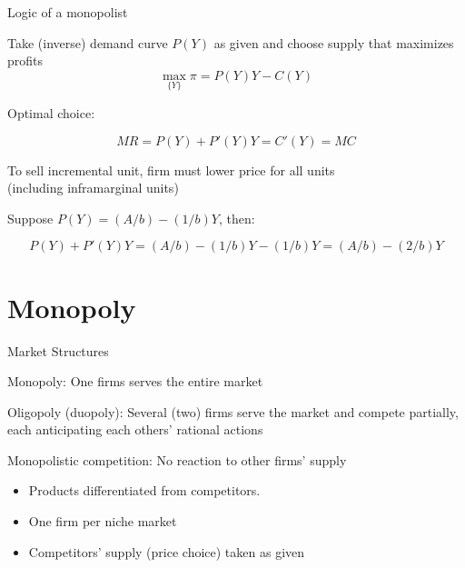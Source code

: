 \documentclass[notes,11pt, aspectratio=169, xcolor=table]{beamer}
\newenvironment{wideitemize}{\itemize\addtolength{\itemsep}{10pt}}{\enditemize}
\begin{document}
\begin{frame}{Logic of a monopolist}

  \begin{wideitemize}
      \item Take (inverse) demand curve $P(Y)$ as given and choose supply that maximizes profits
      \begin{equation*}
        \max_{\{Y\}} \pi = P(Y) Y - C(Y) 
    \end{equation*}


      \item Optimal choice:

      \begin{equation*}
          MR = P(Y) + P'(Y)Y = C'(Y) = MC
      \end{equation*}

      \item To sell incremental unit, firm must lower price for all units \\
      \qquad (including inframarginal units)

      \item Suppose $P(Y) = (A/b) - (1/b)Y$, then:

      \begin{equation*}
          P(Y) + P'(Y)Y= (A/b) - (1/b)Y - (1/b)Y = (A/b) - (2/b)Y 
      \end{equation*}

      
  \end{wideitemize}

  
\end{frame}


\section{Monopoly}

\begin{frame}{Market Structures}

\begin{wideitemize}
    \item Monopoly: One firms serves the entire market
    \item Oligopoly (duopoly): Several (two) firms serve the market and compete partially, each anticipating each others’ rational actions
    \item Monopolistic competition: No reaction to other firms’ supply
    \begin{itemize}
        \item Products differentiated from competitors.
        \item One firm per niche market
        \item Competitors’ supply (price choice) taken as given
    \end{itemize}

\end{wideitemize}

\end{frame}
\end{document}
